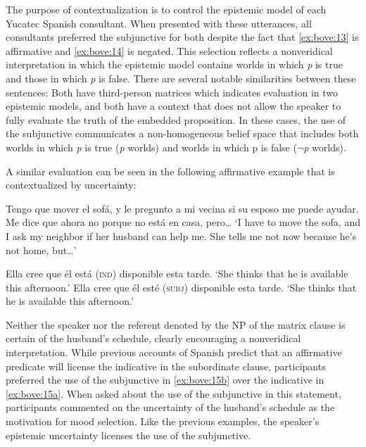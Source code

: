 \documentclass[output=paper,colorlinks,citecolor=brown,
]{langscibook}
\begin{document}
The purpose of contextualization is to control the epistemic model of each Yucatec Spanish consultant. When presented with these utterances, all consultants preferred the subjunctive for both despite the fact that \ref{ex:bove:13} is affirmative and \ref{ex:bove:14} is negated. This selection reflects a nonveridical interpretation in which the epistemic model contains worlds in which \textit{p }is true and those in which \textit{p} is false. There are several notable similarities between these sentences: Both have third-person matrices which indicates evaluation in two epistemic models, and both have a context that does not allow the speaker to fully evaluate the truth of the embedded proposition. In these cases, the use of the subjunctive communicates a non-homogeneous belief space that includes both worlds in which \textit{p} is true (\textit{p }worlds) and worlds in which p is false ($\neg$\textit{p }worlds).



A similar evaluation can be seen in the following affirmative example that is contextualized by uncertainty:

\begin{exe} %
    \ex\label{ex:bove:15} 
  Tengo que mover el sofá, y le pregunto a mi vecina si su esposo me puede ayudar. Me dice que ahora no porque no está en casa, pero\dots
 \glt `I have to move the sofa, and I ask my neighbor if her husband can help me. She tells me not now because he’s not home, but\dots'
    \begin{xlist} %
        \ex \label{ex:bove:15a}
           Ella cree que él está (\textsc{ind}) disponible esta tarde.%
                   \glt `She thinks that he is available this afternoon.'
        \ex\label{ex:bove:15b}
           Ella cree que él esté (\textsc{subj}) disponible esta tarde.
             \glt `She thinks that he is available this afternoon.'
\end{xlist}
\end{exe}




Neither the speaker nor the referent denoted by the NP of the matrix clause is certain of the husband's schedule, clearly encouraging a nonveridical interpretation. While previous accounts of Spanish predict that an affirmative predicate will license the indicative in the subordinate clause, participants preferred the use of the subjunctive in \ref{ex:bove:15b} over the indicative in \ref{ex:bove:15a}. When asked about the use of the subjunctive in this statement, participants commented on the uncertainty of the husband's schedule as the motivation for mood selection. Like the previous examples, the speaker's epistemic uncertainty licenses the use of the subjunctive.
\end{document}
